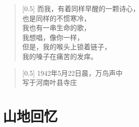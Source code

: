 \documentclass[12pt,UTF-8,openany]{ctexbook}
\begin{document}
\begin{normalsize}
    
    \begin{verse}[0.5\linewidth]
        而我，有着同样早醒的一颗诗心， \\
        也是同样的不惯寒冷， \\
        我也有一串生命的歌， \\
        我想唱，像你一样， \\
        但是，我的喉头上锁着链子， \\
        我的嗓子在痛苦的发痒。
    \end{verse}
    
    
    \begin{verse}[0.5\linewidth]
        \hfill 1942年5月22日晨，万鸟声中 \\
        \hfill 写于河南叶县寺庄
    \end{verse}
    
\end{normalsize}



\chapter{山地回忆}
\end{document}
